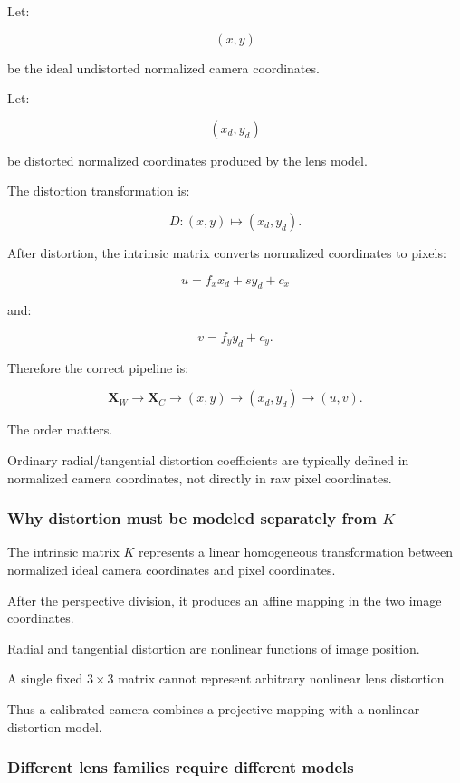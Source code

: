 Let:

\[
 (x,y)
\]

be the ideal undistorted normalized camera coordinates.

Let:

\[
 (x_d,y_d)
\]

be distorted normalized coordinates produced by the lens model.

The distortion transformation is:

\[
 \boxed{ D: (x,y)\mapsto(x_d,y_d) }.
\]

After distortion, the intrinsic matrix converts normalized coordinates to pixels:

\[
 \boxed{ u=f_xx_d+sy_d+c_x }
\]

and:

\[
 \boxed{ v=f_yy_d+c_y }.
\]

Therefore the correct pipeline is:

\[
 \boxed{ \mathbf X_W \rightarrow \mathbf X_C \rightarrow (x,y) \rightarrow (x_d,y_d) \rightarrow (u,v) }.
\]

The order matters.

Ordinary radial/tangential distortion coefficients are typically defined in normalized camera coordinates, not directly in raw pixel coordinates.

\subsubsection{\texorpdfstring{Why distortion must be modeled separately from \(K\)}{Why distortion must be modeled separately from K}}\label{why-distortion-must-be-modeled-separately-from-k}

The intrinsic matrix \(K\) represents a linear homogeneous transformation between normalized ideal camera coordinates and pixel coordinates.

After the perspective division, it produces an affine mapping in the two image coordinates.

Radial and tangential distortion are nonlinear functions of image position.

A single fixed \(3\times3\) matrix cannot represent arbitrary nonlinear lens distortion.

Thus a calibrated camera combines a projective mapping with a nonlinear distortion model.

\subsubsection{Different lens families require different models}\label{different-lens-families-require-different-models}

